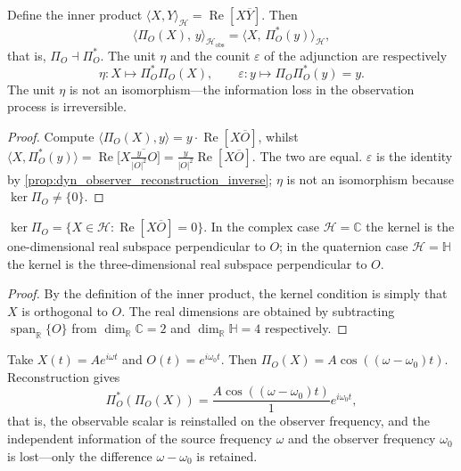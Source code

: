 \begin{theorem}\label{thm:dyn_observer_adjunction}
Define the inner product $\langle X,Y\rangle_{\mathcal H}=\operatorname{Re}[X\overline Y]$. Then
\[
\langle \Pi_O(X),\,y\rangle_{\mathcal H_{\text{obs}}}=\langle X,\,\Pi_O^\ast(y)\rangle_{\mathcal H},
\]
that is, $\Pi_O\dashv\Pi_O^\ast$. The unit $\eta$ and the counit $\varepsilon$ of the adjunction are respectively
\[
\eta:X\mapsto\Pi_O^\ast\Pi_O(X),\qquad
\varepsilon:y\mapsto\Pi_O\Pi_O^\ast(y)=y.
\]
The unit $\eta$ is not an isomorphism---the information loss in the observation process is irreversible.
\end{theorem}

\begin{proof}
Compute $\langle \Pi_O(X),y\rangle=y\cdot\operatorname{Re}[X\overline O]$, whilst
$\langle X,\Pi_O^\ast(y)\rangle=\operatorname{Re}\big[X\overline{\tfrac{y}{|O|^2}O}\big]=\tfrac{y}{|O|^2}\operatorname{Re}[X\overline O]$. The two are equal.
$\varepsilon$ is the identity by \cref{prop:dyn_observer_reconstruction_inverse}; $\eta$ is not an isomorphism because $\ker\Pi_O\neq\{0\}$.
\end{proof}

\begin{corollary}\label{cor:dyn_unobservable_subspace}
$\ker\Pi_O=\{X\in\mathcal H:\operatorname{Re}[X\overline O]=0\}$. In the complex case $\mathcal H=\mathbb C$ the kernel is the one-dimensional real subspace perpendicular to $O$; in the quaternion case $\mathcal H=\mathbb H$ the kernel is the three-dimensional real subspace perpendicular to $O$.
\end{corollary}

\begin{proof}
By the definition of the inner product, the kernel condition is simply that $X$ is orthogonal to $O$. The real dimensions are obtained by subtracting $\operatorname{span}_{\mathbb R}\{O\}$ from $\dim_{\mathbb R}\mathbb C=2$ and $\dim_{\mathbb R}\mathbb H=4$ respectively.
\end{proof}

\begin{example}\label{ex:dyn_observer_reconstruction_example}
Take $X(t)=A e^{i\omega t}$ and $O(t)=e^{i\omega_0 t}$. Then $\Pi_O(X)=A\cos((\omega-\omega_0)t)$.
Reconstruction gives
\[
\Pi_O^\ast(\Pi_O(X))=\frac{A\cos((\omega-\omega_0)t)}{1}e^{i\omega_0 t},
\]
that is, the observable scalar is reinstalled on the observer frequency, and the independent information of the source frequency $\omega$ and the observer frequency $\omega_0$ is lost---only the difference $\omega-\omega_0$ is retained.
\end{example}

